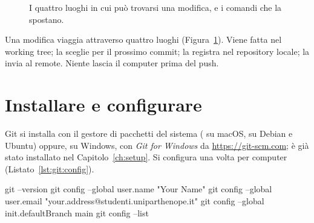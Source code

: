 \begin{figure}[htb]
\centering
{}
\caption{I quattro luoghi in cui può trovarsi una modifica, e i comandi che la spostano.}
\label{fig:git:areas}
\end{figure}

Una modifica viaggia attraverso quattro luoghi (Figura~\ref{fig:git:areas}).
Viene fatta nel working tree;  la sceglie per il prossimo
commit;  la registra nel repository locale; 
la invia al remote. Niente lascia il computer prima del push.

\section{Installare e configurare}

Git si installa con il gestore di pacchetti del sistema
( su macOS,  su Debian e
Ubuntu) oppure, su Windows, con \emph{Git for Windows} da
\url{https://git-scm.com}; è già stato installato nel
Capitolo~\ref{ch:setup}. Si configura una volta per computer
(Listato~\ref{lst:git:config}).

\begin{shell}[caption={Configurare Git, una volta.},label=lst:git:config]
git --version
git config --global user.name  "Your Name"
git config --global user.email "your.address@studenti.uniparthenope.it"
git config --global init.defaultBranch main
git config --list
\end{shell}

